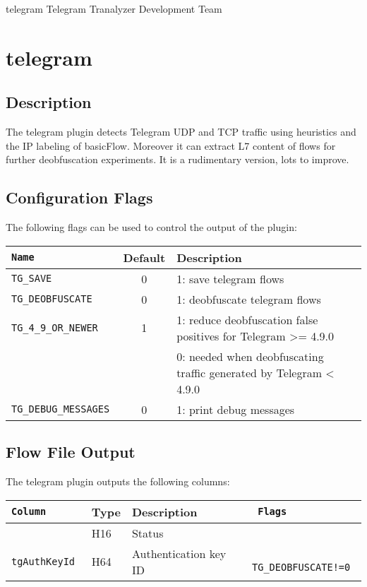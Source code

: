 \documentclass[documentation]{subfiles}
\begin{document}
\trantitle
    {telegram} %
    {Telegram} %
    {Tranalyzer Development Team} %

\section{telegram}\label{s:telegram}

\subsection{Description}
The telegram plugin detects Telegram UDP and TCP traffic using heuristics and
the IP labeling of basicFlow. Moreover it can extract L7 content of flows for
further deobfuscation experiments. It is a rudimentary version, lots to improve.


\subsection{Configuration Flags}
The following flags can be used to control the output of the plugin:
\begin{longtable}{>{\tt}lcl}
    \toprule
    {\bf Name} & {\bf Default} & {\bf Description}\\
    \midrule\endhead%
    TG\_SAVE            & 0 & 1: save telegram flows\\
    TG\_DEOBFUSCATE     & 0 & 1: deobfuscate telegram flows\\
    TG\_4\_9\_OR\_NEWER & 1 & 1: reduce deobfuscation false positives for Telegram >= 4.9.0\\
                        &   & 0: needed when deobfuscating traffic generated by Telegram < 4.9.0\\
    TG\_DEBUG\_MESSAGES & 0 & 1: print debug messages\\
    \bottomrule
\end{longtable}

\subsection{Flow File Output}
The telegram plugin outputs the following columns:
\begin{longtable}{>{\tt}lll>{\tt\small}l}
    \toprule
    {\bf Column} & {\bf Type} & {\bf Description} & {\bf Flags}\\
    \midrule\endhead%
    \nameref{tgStat} & H16 & Status                & \\
    tgAuthKeyId      & H64 & Authentication key ID & TG\_DEOBFUSCATE!=0\\
    \bottomrule
\end{longtable}
\end{document}
